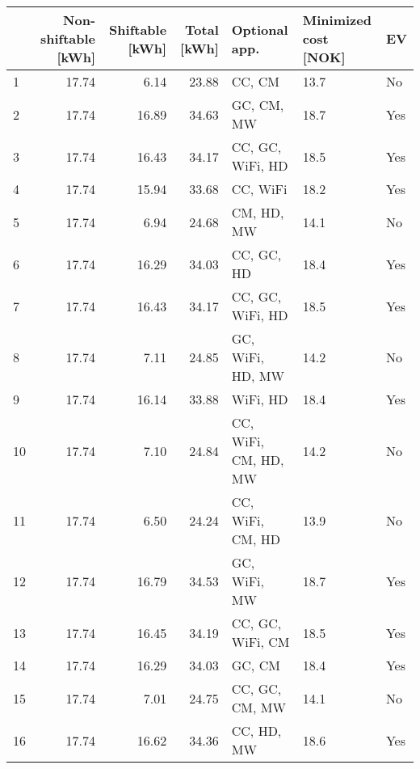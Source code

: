 \begin{tabular}{lrrrlll}
\toprule
{} &  Non-shiftable [kWh] &  Shiftable [kWh] &  Total [kWh] &         Optional app. & Minimized cost [NOK] &   EV \\
\midrule
1  &                17.74 &             6.14 &        23.88 &                CC, CM &                 13.7 &   No \\
2  &                17.74 &            16.89 &        34.63 &            GC, CM, MW &                 18.7 &  Yes \\
3  &                17.74 &            16.43 &        34.17 &      CC, GC, WiFi, HD &                 18.5 &  Yes \\
4  &                17.74 &            15.94 &        33.68 &              CC, WiFi &                 18.2 &  Yes \\
5  &                17.74 &             6.94 &        24.68 &            CM, HD, MW &                 14.1 &   No \\
6  &                17.74 &            16.29 &        34.03 &            CC, GC, HD &                 18.4 &  Yes \\
7  &                17.74 &            16.43 &        34.17 &      CC, GC, WiFi, HD &                 18.5 &  Yes \\
8  &                17.74 &             7.11 &        24.85 &      GC, WiFi, HD, MW &                 14.2 &   No \\
9  &                17.74 &            16.14 &        33.88 &              WiFi, HD &                 18.4 &  Yes \\
10 &                17.74 &             7.10 &        24.84 &  CC, WiFi, CM, HD, MW &                 14.2 &   No \\
11 &                17.74 &             6.50 &        24.24 &      CC, WiFi, CM, HD &                 13.9 &   No \\
12 &                17.74 &            16.79 &        34.53 &          GC, WiFi, MW &                 18.7 &  Yes \\
13 &                17.74 &            16.45 &        34.19 &      CC, GC, WiFi, CM &                 18.5 &  Yes \\
14 &                17.74 &            16.29 &        34.03 &                GC, CM &                 18.4 &  Yes \\
15 &                17.74 &             7.01 &        24.75 &        CC, GC, CM, MW &                 14.1 &   No \\
16 &                17.74 &            16.62 &        34.36 &            CC, HD, MW &                 18.6 &  Yes \\

\end{tabular}
